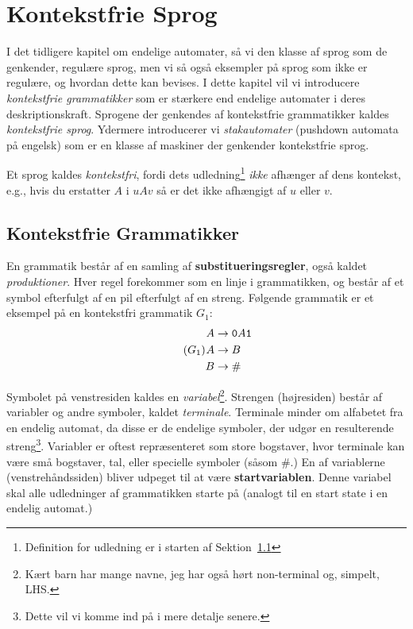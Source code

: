 \chapter{Kontekstfrie Sprog}

I det tidligere kapitel om endelige automater, så vi den klasse af sprog som de genkender, regulære sprog, men vi så også eksempler på sprog som ikke er regulære, og hvordan dette kan bevises. I dette kapitel vil vi introducere \textit{kontekstfrie grammatikker} som er stærkere end endelige automater i deres deskriptionskraft. Sprogene der genkendes af kontekstfrie grammatikker kaldes \textit{kontekstfrie sprog}. Ydermere introducerer vi \textit{stakautomater} (pushdown automata på engelsk) som er en klasse af maskiner der genkender kontekstfrie sprog.

Et sprog kaldes \textit{kontekstfri}, fordi dets udledning\footnote{Definition for udledning  er i starten af Sektion~\ref{sec:cfg}} \textit{ikke} afhænger af dens kontekst, e.g., hvis du erstatter $A$ i $uAv$ så er det ikke afhængigt af $u$ eller $v$.

\section{Kontekstfrie Grammatikker}
\label{sec:cfg}
En grammatik består af en samling af \textbf{substitueringsregler}, også kaldet \textit{produktioner}. Hver regel forekommer som en linje i grammatikken,  og består af et symbol efterfulgt af en pil efterfulgt af en streng. Følgende grammatik er et eksempel på en kontekstfri grammatik $G_{1}$:
\begin{equation}
	\tag{$G_{1}$}
	\begin{split}
		A &\rightarrow \mathtt{0}A \mathtt{1}\\
		A &\rightarrow B\\
		B &\rightarrow \mathtt{\#}
	\end{split}
	\label{eqn:G1}
\end{equation}

Symbolet på venstresiden kaldes en \textit{variabel}\footnote{Kært barn har mange navne, jeg har også hørt non-terminal og, simpelt, LHS.}. Strengen (højresiden) består af variabler og andre symboler, kaldet \textit{terminale}. Terminale minder om alfabetet fra en endelig automat, da disse er de endelige symboler, der udgør en resulterende streng\footnote{Dette vil vi komme ind på i mere detalje senere.}. Variabler er oftest repræsenteret som store bogstaver, hvor terminale kan være små bogstaver, tal, eller specielle symboler (såsom \#.) En af variablerne (venstrehåndssiden) bliver udpeget til at være \textbf{startvariablen}. Denne variabel skal alle udledninger af grammatikken starte på (analogt til en start state i en endelig automat.)

